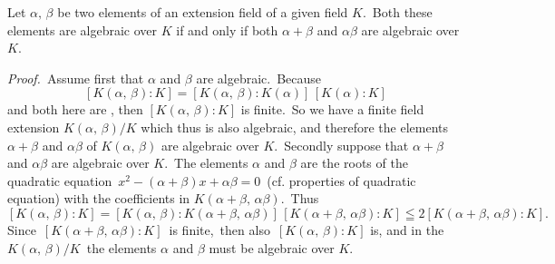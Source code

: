 \documentclass[12pt]{article}
\theoremstyle{definition}
\begin{document}
Let $\alpha,\,\beta$ be two elements of an extension field of a given field $K$.\,  Both these elements are algebraic over $K$ if and only if both $\alpha\!+\!\beta$ and $\alpha\beta$ are algebraic over $K$.

{\em Proof.}\, Assume first that $\alpha$ and $\beta$ are algebraic.\, Because
$$[K(\alpha,\,\beta):K] = [K(\alpha,\,\beta):K(\alpha)]\,[K(\alpha):K]$$
and both  here are , then $[K(\alpha,\,\beta):K]$ is finite.\, So we have a finite field extension $K(\alpha,\,\beta)/K$ which thus is also algebraic, and therefore the elements $\alpha\!+\!\beta$ and $\alpha\beta$ of $K(\alpha,\,\beta)$ are algebraic over $K$.\, Secondly suppose that $\alpha\!+\!\beta$ and $\alpha\beta$ are algebraic over $K$.\, The elements $\alpha$ and $\beta$ are the roots of the quadratic equation\, $x^2-(\alpha\!+\!\beta)x+\alpha\beta = 0$\, (cf. properties of quadratic equation) with the coefficients in $K(\alpha\!+\!\beta,\,\alpha\beta)$.\, Thus
$$[K(\alpha,\,\beta):K] = 
[K(\alpha,\,\beta):K(\alpha\!+\!\beta,\,\alpha\beta)]\,
[K(\alpha\!+\!\beta,\,\alpha\beta):K] \leqq 2 
[K(\alpha\!+\!\beta,\,\alpha\beta):K].$$
Since\, $[K(\alpha\!+\!\beta,\,\alpha\beta):K]$\, is finite,\, then also\, $[K(\alpha,\,\beta):K]$ is, and in the \, $K(\alpha,\,\beta)/K$\, the elements $\alpha$ and $\beta$ must be algebraic over $K$.
\end{document}
